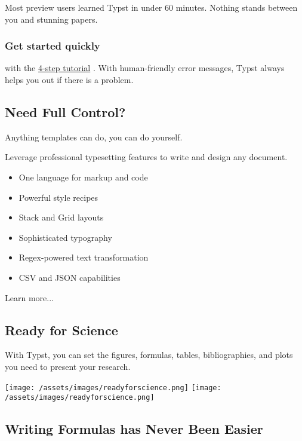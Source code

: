 Most preview users learned Typst in under 60 minutes. Nothing stands
between you and stunning papers.

\subsubsection{Get started quickly}\label{get-started-quickly}

with the \href{/docs/tutorial/}{4-step tutorial} . With human-friendly
error messages, Typst always helps you out if there is a problem.

\label{need-full-control}
\subsection{Need Full Control?}\label{need-full-control}

Anything templates can do, you can do yourself.

Leverage professional typesetting features to write and design any
document.

\label{feature-drawer}
\begin{itemize}
\tightlist
\item
  One language for markup and code
\item
  Powerful style recipes
\item
  Stack and Grid layouts
\item
  Sophisticated typography
\item
  Regex-powered text transformation
\item
  CSV and JSON capabilities
\end{itemize}

Learn more...

\label{ready-science}
\subsection{Ready for Science}\label{ready-for-science}

With Typst, you can set the figures, formulas, tables, bibliographies,
and plots you need to present your research.

\texttt{[image: /assets/images/readyforscience.png]}
\texttt{[image: /assets/images/readyforscience.png]}

\label{writing-formulas}
\subsection{Writing Formulas has Never Been
Easier}\label{writing-formulas-has-never-been-easier}

